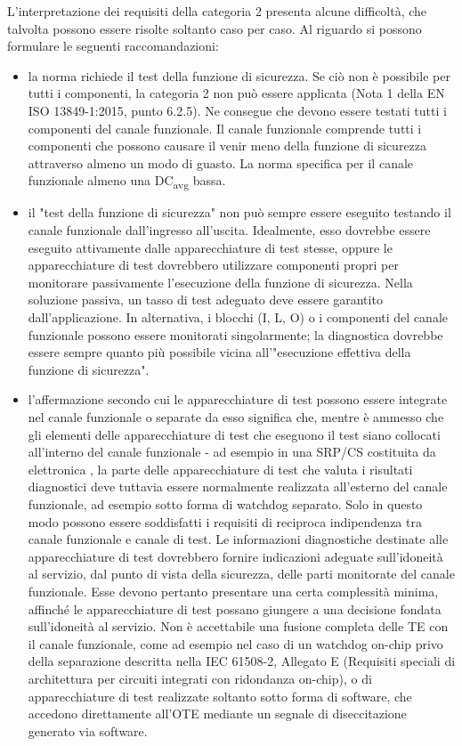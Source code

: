 L'interpretazione dei requisiti della categoria 2 presenta alcune difficoltà, che talvolta possono essere risolte soltanto caso per caso. Al riguardo si possono formulare le seguenti raccomandazioni:
\begin{itemize}
    \item la norma richiede il test della funzione di sicurezza. Se ciò non è possibile per tutti i componenti, la categoria 2 non può essere applicata (Nota 1 della EN ISO 13849-1:2015, punto 6.2.5). Ne consegue che devono essere testati tutti i componenti del canale funzionale. Il canale funzionale comprende tutti i componenti che possono causare il venir meno della funzione di sicurezza attraverso almeno un modo di guasto. La norma specifica per il canale funzionale almeno una DC\textsubscript{avg} bassa.
    \item il "test della funzione di sicurezza" non può sempre essere eseguito testando il canale funzionale dall'ingresso all'uscita. Idealmente, esso dovrebbe essere eseguito attivamente dalle apparecchiature di test stesse, oppure le apparecchiature di test dovrebbero utilizzare componenti propri per monitorare passivamente l'esecuzione della funzione di sicurezza. Nella soluzione passiva, un tasso di test adeguato deve essere garantito dall'applicazione. In alternativa, i blocchi (I, L, O) o i componenti del canale funzionale possono essere monitorati singolarmente; la diagnostica dovrebbe essere sempre quanto più possibile vicina all'"esecuzione effettiva della funzione di sicurezza".
    \item l'affermazione secondo cui le apparecchiature di test possono essere integrate nel canale funzionale o separate da esso significa che, mentre è ammesso che gli elementi delle apparecchiature di test che eseguono il test siano collocati all'interno del canale funzionale - ad esempio in una SRP/CS costituita da elettronica , la parte delle apparecchiature di test che valuta i risultati diagnostici deve tuttavia essere normalmente realizzata all'esterno del canale funzionale, ad esempio sotto forma di watchdog separato. Solo in questo modo possono essere soddisfatti i requisiti di reciproca indipendenza tra canale funzionale e canale di test. Le informazioni diagnostiche destinate alle apparecchiature di test dovrebbero fornire indicazioni adeguate sull'idoneità al servizio, dal punto di vista della sicurezza, delle parti monitorate del canale funzionale. Esse devono pertanto presentare una certa complessità minima, affinché le apparecchiature di test possano giungere a una decisione fondata sull'idoneità al servizio. Non è accettabile una fusione completa delle TE con il canale funzionale, come ad esempio nel caso di un watchdog on-chip privo della separazione descritta nella IEC 61508-2, Allegato E (Requisiti speciali di architettura per circuiti integrati con ridondanza on-chip), o di apparecchiature di test realizzate soltanto sotto forma di software, che accedono direttamente all'OTE mediante un segnale di diseccitazione generato via software.

\end{itemize}
